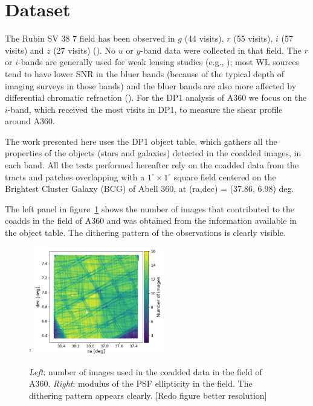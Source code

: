 \documentclass[SE,lsstdraft,authoryear,toc]{lsstdoc}
\begin{document}
\section{Dataset}
\label{sec:data}
The Rubin SV 38 7 field has been observed in $g$ (44 visits), $r$ (55 visits), $i$ (57 visits) and $z$ (27 visits) (). No $u$ or $y$-band data were collected in that field. The $r$ or $i$-bands are generally used for weak lensing studies (e.g., \citealp{2018MNRAS.481.3170M}); most WL sources tend to have lower SNR in the bluer bands (because of the typical depth of imaging surveys in those bands) and the bluer bands are also more affected by differential chromatic refraction (). For the DP1 analysis of A360 we focus on the $i$-band, which received the most visits in DP1, to measure the shear profile around A360. 

The work presented here uses the DP1 object table, which gathers all the properties of the objects (stars and galaxies) detected in the coadded images, in each band.
All the tests performed hereafter rely on the coadded data from the tracts and patches overlapping with a $1^\circ \times 1^\circ$ square field centered on the Brightest Cluster Galaxy (BCG) of Abell 360, at (ra,dec) = (37.86, 6.98) deg. 


 The left panel in figure~\ref{fig:dither} shows the number of images that contributed to the coadds in the field of A360 and was obtained from the  information available in the object table. The dithering pattern of the observations is clearly visible. 


\begin{figure}
\centering'
\includegraphics[width=0.5\textwidth]{Figures/nimages.png}
\caption{\emph{Left}: number of images used in the coadded data in the field of A360. \emph{Right}: modulus of the PSF ellipticity in the field. The dithering pattern appears clearly. {\color{red}[Redo figure better resolution]}\label{fig:dither}}
\end{figure}
\end{document}
